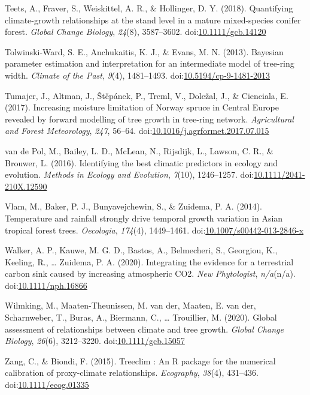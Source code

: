 \documentclass[
]{article}
\newlength{\cslhangindent}
\newenvironment{cslreferences}%
  {\setlength{\parindent}{0pt}%
  \everypar{\setlength{\hangindent}{\cslhangindent}}\ignorespaces}%
  {\par}
\begin{document}
\begin{cslreferences}
\leavevmode\hypertarget{ref-teets_quantifying_2018}{}%
Teets, A., Fraver, S., Weiskittel, A. R., \& Hollinger, D. Y. (2018).
Quantifying climate-growth relationships at the stand level in a mature
mixed-species conifer forest. \emph{Global Change Biology},
\emph{24}(8), 3587--3602.
doi:\href{https://doi.org/10.1111/gcb.14120}{10.1111/gcb.14120}

\leavevmode\hypertarget{ref-tolwinski-ward_bayesian_2013}{}%
Tolwinski-Ward, S. E., Anchukaitis, K. J., \& Evans, M. N. (2013).
Bayesian parameter estimation and interpretation for an intermediate
model of tree-ring width. \emph{Climate of the Past}, \emph{9}(4),
1481--1493.
doi:\href{https://doi.org/10.5194/cp-9-1481-2013}{10.5194/cp-9-1481-2013}

\leavevmode\hypertarget{ref-tumajer_increasing_2017}{}%
Tumajer, J., Altman, J., Štěpánek, P., Treml, V., Doležal, J., \&
Cienciala, E. (2017). Increasing moisture limitation of Norway spruce in
Central Europe revealed by forward modelling of tree growth in tree-ring
network. \emph{Agricultural and Forest Meteorology}, \emph{247}, 56--64.
doi:\href{https://doi.org/10.1016/j.agrformet.2017.07.015}{10.1016/j.agrformet.2017.07.015}

\leavevmode\hypertarget{ref-van_de_pol_identifying_2016}{}%
van de Pol, M., Bailey, L. D., McLean, N., Rijsdijk, L., Lawson, C. R.,
\& Brouwer, L. (2016). Identifying the best climatic predictors in
ecology and evolution. \emph{Methods in Ecology and Evolution},
\emph{7}(10), 1246--1257.
doi:\href{https://doi.org/10.1111/2041-210X.12590}{10.1111/2041-210X.12590}

\leavevmode\hypertarget{ref-vlam_temperature_2014}{}%
Vlam, M., Baker, P. J., Bunyavejchewin, S., \& Zuidema, P. A. (2014).
Temperature and rainfall strongly drive temporal growth variation in
Asian tropical forest trees. \emph{Oecologia}, \emph{174}(4),
1449--1461.
doi:\href{https://doi.org/10.1007/s00442-013-2846-x}{10.1007/s00442-013-2846-x}

\leavevmode\hypertarget{ref-walker_integrating_2020}{}%
Walker, A. P., Kauwe, M. G. D., Bastos, A., Belmecheri, S., Georgiou,
K., Keeling, R., \ldots{} Zuidema, P. A. (2020). Integrating the
evidence for a terrestrial carbon sink caused by increasing atmospheric
CO2. \emph{New Phytologist}, \emph{n/a}(n/a).
doi:\href{https://doi.org/10.1111/nph.16866}{10.1111/nph.16866}

\leavevmode\hypertarget{ref-wilmking_global_2020}{}%
Wilmking, M., Maaten-Theunissen, M. van der, Maaten, E. van der,
Scharnweber, T., Buras, A., Biermann, C., \ldots{} Trouillier, M.
(2020). Global assessment of relationships between climate and tree
growth. \emph{Global Change Biology}, \emph{26}(6), 3212--3220.
doi:\href{https://doi.org/10.1111/gcb.15057}{10.1111/gcb.15057}

\leavevmode\hypertarget{ref-zang_treeclim_2015}{}%
Zang, C., \& Biondi, F. (2015). Treeclim : An R package for the
numerical calibration of proxy-climate relationships. \emph{Ecography},
\emph{38}(4), 431--436.
doi:\href{https://doi.org/10.1111/ecog.01335}{10.1111/ecog.01335}
\end{cslreferences}
\end{document}
